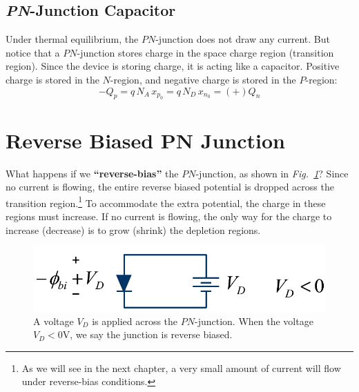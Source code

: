 \subsection{\emph{PN}-Junction Capacitor}
Under thermal equilibrium, the $PN$-junction does not draw any current.   But notice that a $PN$-junction stores charge in the space charge region (transition region).   Since the device is storing charge, it is acting like a capacitor.  Positive charge is stored in the $N$-region, and negative charge is stored in the $P$-region:
    \begin{equation} 
        -Q_p = q\,N_A\,x_{p_0} = q\,N_D\,x_{n_0} = (+)Q_n
    \end{equation}
\section{Reverse Biased PN Junction}
What happens if we \textbf{“reverse-bias”} the $PN$-junction, as shown in \emph{Fig.~\ref{fig:slide28}}?  Since no current is flowing, the entire reverse biased potential is dropped across the transition region.\footnote{As we will see in the next chapter, a very small amount of current will flow under reverse-bias conditions.}  To accommodate the extra potential, the charge in these regions must increase.  If no current is flowing, the only way for the charge to increase (decrease) is to grow (shrink) the depletion regions.
\begin{figure}[H]
\centering
\includegraphics[width=.5\columnwidth]{slide28}
\caption{A voltage $V_D$ is applied across the $PN$-junction.  When the voltage $V_D < 0$V, we say the junction is reverse biased.}
\label{fig:slide28}
\end{figure}
